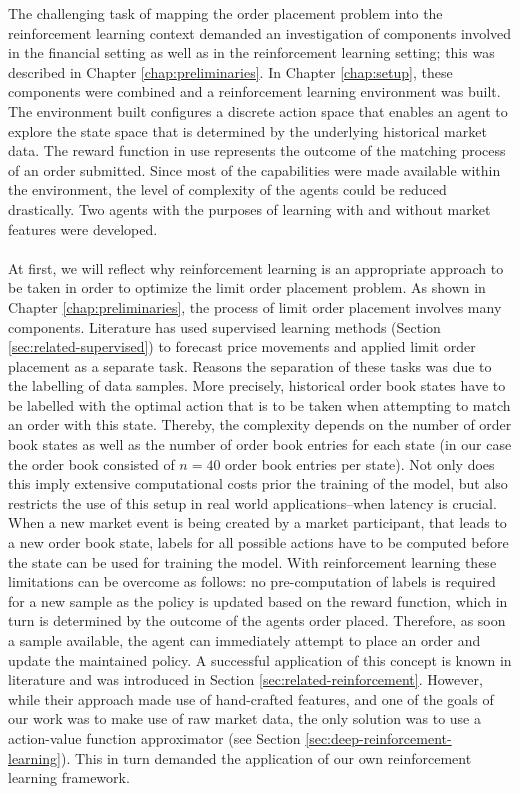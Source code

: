     The challenging task of mapping the order placement problem into the reinforcement learning context demanded an investigation of components involved in the financial setting as well as in the reinforcement learning setting; this was described in Chapter \ref{chap:preliminaries}.
    In Chapter \ref{chap:setup}, these components were combined and a reinforcement learning environment was built.
    The environment built configures a discrete action space that enables an agent to explore the state space that is determined by the underlying historical market data.
    The reward function in use represents the outcome of the matching process of an order submitted.
    Since most of the capabilities were made available within the environment, the level of complexity of the agents could be reduced drastically.
    Two agents with the purposes of learning with and without market features were developed.
    \\
    \\
    At first, we will reflect why reinforcement learning is an appropriate approach to be taken in order to optimize the limit order placement problem.
    As shown in Chapter \ref{chap:preliminaries}, the process of limit order placement involves many components.
    Literature has used supervised learning methods (Section \ref{sec:related-supervised}) to forecast price movements and applied limit order placement as a separate task.
    Reasons the separation of these tasks was due to the labelling of data samples.
    More precisely, historical order book states have to be labelled with the optimal action that is to be taken when attempting to match an order with this state.
    Thereby, the complexity depends on the number of order book states as well as the number of order book entries for each state (in our case the order book consisted of $n=40$ order book entries per state).
    Not only does this imply extensive computational costs prior the training of the model, but also restricts the use of this setup in real world applications--when latency is crucial.
    When a new market event is being created by a market participant, that leads to a new order book state, labels for all possible actions have to be computed before the state can be used for training the model.
    With reinforcement learning these limitations can be overcome as follows: no pre-computation of labels is required for a new sample as the policy is updated based on the reward function, which in turn is determined by the outcome of the agents order placed.
    Therefore, as soon a sample available, the agent can immediately attempt to place an order and update the maintained policy.
    A successful application of this concept is known in literature\cite{nevmyvaka2006reinforcement} and was introduced in Section \ref{sec:related-reinforcement}.
    However, while their approach made use of hand-crafted features, and one of the goals of our work was to make use of raw market data, the only solution was to use a action-value function approximator (see Section \ref{sec:deep-reinforcement-learning}).
    This in turn demanded the application of our own reinforcement learning framework.
    
